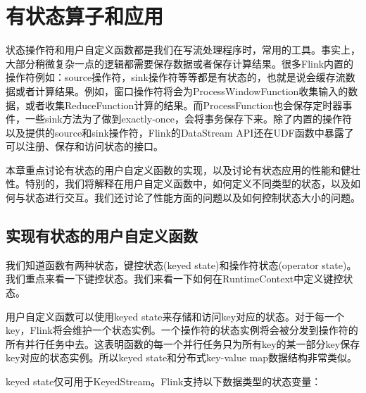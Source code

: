 \documentclass[cn,11pt,chinese]{elegantbook}
\begin{document}
\chapter{有状态算子和应用}

状态操作符和用户自定义函数都是我们在写流处理程序时，常用的工具。事实上，大部分稍微复杂一点的逻辑都需要保存数据或者保存计算结果。很多Flink内置的操作符例如：source操作符，sink操作符等等都是有状态的，也就是说会缓存流数据或者计算结果。例如，窗口操作符将会为ProcessWindowFunction收集输入的数据，或者收集ReduceFunction计算的结果。而ProcessFunction也会保存定时器事件，一些sink方法为了做到exactly-once，会将事务保存下来。除了内置的操作符以及提供的source和sink操作符，Flink的DataStream API还在UDF函数中暴露了可以注册、保存和访问状态的接口。

本章重点讨论有状态的用户自定义函数的实现，以及讨论有状态应用的性能和健壮性。特别的，我们将解释在用户自定义函数中，如何定义不同类型的状态，以及如何与状态进行交互。我们还讨论了性能方面的问题以及如何控制状态大小的问题。

\section{实现有状态的用户自定义函数}

我们知道函数有两种状态，键控状态(keyed state)和操作符状态(operator state)。我们重点来看一下键控状态。我们来看一下如何在RuntimeContext中定义键控状态。

用户自定义函数可以使用keyed state来存储和访问key对应的状态。对于每一个key，Flink将会维护一个状态实例。一个操作符的状态实例将会被分发到操作符的所有并行任务中去。这表明函数的每一个并行任务只为所有key的某一部分key保存key对应的状态实例。所以keyed state和分布式key-value map数据结构非常类似。

keyed state仅可用于KeyedStream。Flink支持以下数据类型的状态变量：
\end{document}
